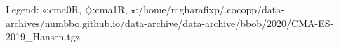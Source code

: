 Legend: {\color{NavyBlue}$\circ$}:cma0R, {\color{Magenta}$\diamondsuit$}:cma1R, {\color{Orange}$\star$}:/home/mgharafixp/.cocopp/data-archives/numbbo.github.io/data-archive/data-archive/bbob/2020/CMA-ES-2019\_Hansen.tgz